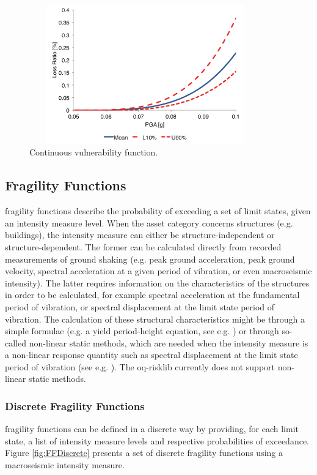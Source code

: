 \begin{figure}[ht]
\centering
\includegraphics[width=10cm,height=6cm]{./figures/risk/VFContinuous}
\caption{Continuous vulnerability function.}
\label{fig:VFContinuous}
\end{figure}
\color{black}

\subsection{Fragility Functions}
\Glspl{fragility function} describe the probability of exceeding a set of limit states, given an intensity measure level. When the asset category concerns structures (e.g. buildings), the intensity measure can either be structure-independent or structure-dependent. The former can be calculated directly from recorded measurements of ground shaking (e.g. peak ground acceleration, peak ground velocity, spectral acceleration at a given period of vibration, or even macroseismic intensity). The latter requires information on the characteristics of the structures in order to be calculated, for example spectral acceleration at the fundamental period of vibration, or spectral displacement at the limit state period of vibration. The calculation of these structural characteristics might be through a simple formulae (e.g. a yield period-height equation, see e.g. \citet{CrowleyPinho2004} ) or through so-called non-linear static methods, which are needed when the intensity measure is a non-linear response quantity such as spectral displacement at the limit state period of vibration (see e.g. \citet{FEMA440ATC2005}). The oq-risklib currently does not support non-linear static methods.

\subsubsection{Discrete Fragility Functions}
\Glspl{fragility function} can be defined in a discrete way by providing, for each limit state, a list of intensity measure levels and respective probabilities of exceedance. Figure \ref{fig:FFDiscrete} presents a set of discrete \glspl{fragility function} using a macroseismic intensity measure. 

